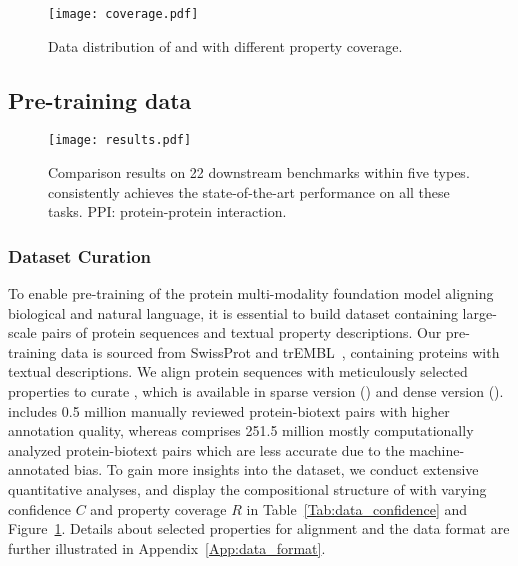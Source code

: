 \begin{figure}[ht]
    \centering
    \texttt{[image: coverage.pdf]}
    \caption{Data distribution of \ourdatasetS and \ourdatasetD with different property coverage.}
    \vspace{-1em}
    \label{Fig:data_coverage}
\end{figure}
\subsection{Pre-training data}
\label{Sec:data}
\begin{figure*}[htbp]
    \centering
    \texttt{[image: results.pdf]}\vspace{-0.5em}
    \caption{Comparison results on 22 downstream benchmarks within five types. \ourapproach consistently achieves the state-of-the-art performance on all these tasks. PPI: protein-protein interaction.}
    \label{Fig:results}\vspace{-1em}
\end{figure*}
\subsubsection{Dataset Curation}
To enable pre-training of the protein multi-modality foundation model aligning biological and natural language, it is essential to build dataset containing large-scale pairs of protein sequences and textual property descriptions. Our pre-training data is sourced from SwissProt and trEMBL~\cite{Swiss_trEMBL}, containing proteins with textual descriptions. 
We align protein sequences with meticulously selected properties to curate \ourdataset, which is available in sparse version (\ourdatasetS) and dense version (\ourdatasetD). \ourdatasetS includes 0.5 million manually reviewed protein-biotext pairs with higher annotation quality, whereas \ourdatasetD comprises 251.5 million mostly computationally analyzed protein-biotext pairs which are less accurate due to the machine-annotated bias. 
To gain more insights into the dataset, we conduct extensive quantitative analyses, and display the compositional structure of \ourdataset with varying confidence $C$ and property coverage $R$ in Table~\ref{Tab:data_confidence} and Figure~\ref{Fig:data_coverage}. 
Details about selected properties for alignment and the data format are further illustrated in Appendix~\ref{App:data_format}.

